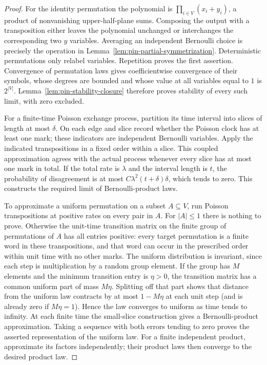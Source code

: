 \begin{proof}
For the identity permutation the polynomial is
$\prod_{i\in V}(x_i+y_i)$, a product of nonvanishing upper-half-plane
sums.  Composing the output with a transposition either leaves the
polynomial unchanged or interchanges the corresponding two $y$ variables.
Averaging an independent Bernoulli choice is precisely the operation in
Lemma~\ref{lem:pin-partial-symmetrization}.  Deterministic permutations
only relabel variables.  Repetition proves the first assertion.
Convergence of permutation laws gives coefficientwise convergence of
their symbols, whose degrees are bounded and whose value at all variables
equal to $1$ is $2^{|V|}$.  Lemma~\ref{lem:pin-stability-closure} therefore
proves stability of every such limit, with zero excluded.

For a finite-time Poisson exchange process, partition its time interval
into slices of length at most $\delta$.  On each edge and slice record
whether the Poisson clock has at least one mark; these indicators are
independent Bernoulli variables.  Apply the indicated transpositions
in a fixed order within a slice.  This coupled approximation agrees with
the actual process whenever every slice has at most one mark in total.
If the total rate is $\lambda$ and the interval length is $t$, the
probability of disagreement is at most $C\lambda^2(t+\delta)\delta$,
which tends to zero.  This constructs the required limit of
Bernoulli-product laws.

To approximate a uniform permutation on a subset $A\subseteq V$,
run Poisson transpositions at positive rates on every pair in $A$.
For $|A|\le1$ there is nothing to prove.  Otherwise the unit-time
transition matrix on the finite group of permutations of $A$ has all
entries positive: every target permutation is a finite word in these
transpositions, and that word can occur in the prescribed order within
unit time with no other marks.  The uniform distribution is invariant,
since each step is multiplication by a random group element.  If the
group has $M$ elements and the minimum transition entry is $\eta>0$,
the transition matrix has a common uniform part of mass $M\eta$.
Splitting off that part shows that distance from the uniform law
contracts by at most $1-M\eta$ at each unit step (and is already zero
if $M\eta=1$).  Hence the law converges to uniform as time tends to
infinity.  At each finite time the small-slice construction gives a
Bernoulli-product approximation.  Taking a sequence with both errors
tending to zero proves the asserted representation of the uniform law.
For a finite independent product, approximate its factors independently;
their product laws then converge to the desired product law.
\end{proof}

